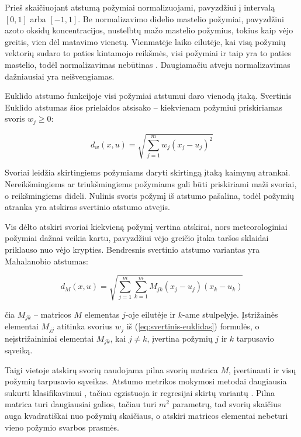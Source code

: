 Prieš skaičiuojant atstumą požymiai normalizuojami, pavyzdžiui į intervalą $[0, 1]$ arba $[-1, 1]$.
Be normalizavimo didelio mastelio požymiai, pavyzdžiui azoto oksidų koncentracijos, nustelbtų mažo mastelio požymius, tokius kaip vėjo greitis, vien dėl matavimo vienetų.
Vienmatėje laiko eilutėje, kai visą požymių vektorių sudaro to paties kintamojo reikšmės, visi požymiai ir taip yra to paties mastelio, todėl normalizavimas nebūtinas \cite{martinez2019}.
Daugiamačiu atveju normalizavimas dažniausiai yra neišvengiamas.

Euklido atstumo funkcijoje visi požymiai atstumui daro vienodą įtaką.
Svertinis Euklido atstumas šios prielaidos atsisako -- kiekvienam požymiui priskiriamas svoris $w_j \geq 0$:

\begin{equation}
    d_w(x, u) = \sqrt{\sum_{j=1}^{m} w_j (x_j - u_j)^2}
    \label{eq:svertinis-euklidas}
\end{equation}

Svoriai leidžia skirtingiems požymiams daryti skirtingą įtaką kaimynų atrankai.
Nereikšmingiems ar triukšmingiems požymiams gali būti priskiriami maži svoriai, o reikšmingiems dideli.
Nulinis svoris požymį iš atstumo pašalina, todėl požymių atranka yra atskiras svertinio atstumo atvejis.

Vis dėlto atskiri svoriai kiekvieną požymį vertina atskirai, nors meteorologiniai požymiai dažnai veikia kartu, pavyzdžiui vėjo greičio įtaka taršos sklaidai
priklauso nuo vėjo krypties.
Bendresnis svertinio atstumo variantas yra Mahalanobio atstumas:

\begin{equation}
    d_M(x, u) = \sqrt{\sum_{j=1}^{m} \sum_{k=1}^{m} M_{jk} (x_j - u_j)(x_k - u_k)}
    \label{eq:mahalanobis}
\end{equation}

čia $M_{jk}$ -- matricos $M$ elementas $j$-oje eilutėje ir $k$-ame stulpelyje.
Įstrižainės elementai $M_{jj}$ atitinka svorius $w_j$ iš (\ref{eq:svertinis-euklidas}) formulės, o
neįstrižaininiai elementai $M_{jk}$, kai $j \neq k$, įvertina požymių $j$ ir $k$ tarpusavio sąveiką.

Taigi vietoje atskirų svorių naudojama pilna svorių matrica $M$, įvertinanti ir visų požymių tarpusavio sąveikas.
Atstumo metrikos mokymosi metodai daugiausia sukurti klasifikavimui \cite{weinberger2009}, tačiau egzistuoja ir regresijai skirtų variantų \cite{weinberger2007mlkr}.
Pilna matrica turi daugiausiai galios, tačiau turi $m^2$ parametrų, tad svorių skaičius auga kvadratiškai nuo požymių skaičiaus, o atskiri matricos elementai nebeturi vieno požymio svarbos prasmės.

